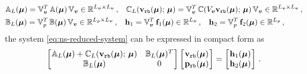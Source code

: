 \documentclass[12pt, a4paper, twoside, openright]{report}
\numberwithin{equation}{chapter}
\theoremstyle{theorem}
\theoremstyle{definition}
\theoremstyle{remark}
\theoremstyle{proposition}
\numberwithin{figure}{chapter}
\newcommand{\bg}[1]{\boldsymbol{#1}}
\begin{document}
		\begin{equation*}
			\begin{aligned}
				& \mathbb{A}_L(\bg{\mu}) = \mathbb{V}_{\bg{v}}^T \, \mathbb{A}(\bg{\mu}) \, \mathbb{V}_{\bg{v}} \in \mathbb{R}^{L_{\bg{v}} \times L_{\bg{v}}} \, , \hspace*{0.3cm} \mathbb{C}_L(\mathbf{v}_{\texttt{rb}}(\bg{\mu}); \, \bg{\mu}) =  \mathbb{V}_{\bg{v}}^T \, \mathbb{C}(V_{\bg{v}} \mathbf{v}_{\texttt{rb}}(\bg{\mu}); \, \bg{\mu}) \, \mathbb{V}_{\bg{v}} \in \mathbb{R}^{L_{\bg{v}} \times L_{\bg{v}}} \, , \\
				& \mathbb{B}_L(\bg{\mu}) = \mathbb{V}_p^T \, \mathbb{B}(\bg{\mu}) \, \mathbb{V}_{\bg{v}} \in \mathbb{R}^{L_p \times L_{\bg{v}}} \, , \hspace*{0.3cm} \mathbf{h}_1 = \mathbb{V}_{\bg{v}}^T \, \mathbf{f}_1(\bg{\mu}) \in \mathbb{R}^{L_{\bg{v}}} \, , \hspace*{0.3cm} \mathbf{h}_2 = \mathbb{V}_p^T \, \mathbf{f}_2(\bg{\mu}) \in \mathbb{R}^{L_p} \, , 
			\end{aligned}
		\end{equation*}
		the system \eqref{eq:ns-reduced-system} can be expressed in compact form as
		\begin{equation*}
			\begin{bmatrix}
			\hspace*{-0.15cm}
			\begin{array}{cc}
				\mathbb{A}_L(\bg{\mu}) + \mathbb{C}_L(\mathbf{v}_{\texttt{rb}}(\bg{\mu}); \, \bg{\mu}) & \mathbb{B}_L(\bg{\mu})^T \\
				\mathbb{B}_L(\bg{\mu}) & 0
			\end{array} 
			\hspace*{-0.15cm}
			\end{bmatrix} 
			\begin{bmatrix}
			\hspace*{-0.15cm}
			\begin{array}{c}
				\mathbf{v}_{\texttt{rb}}(\bg{\mu}) \\
				\mathbf{p}_{\texttt{rb}}(\bg{\mu})
			\end{array} 
			\hspace*{-0.15cm}
			\end{bmatrix} 
			=
			\begin{bmatrix}
			\hspace*{-0.15cm}
			\begin{array}{c}
				\mathbf{h}_1(\bg{\mu}) \\
				\mathbf{h}_2(\bg{\mu})
			\end{array} 
			\hspace*{-0.15cm}
			\end{bmatrix} \, .
		\end{equation*}
\end{document}
